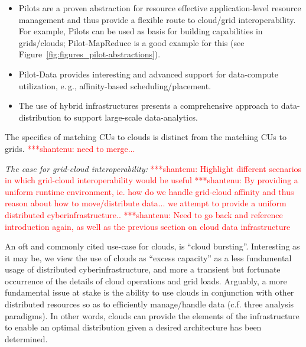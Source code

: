 \documentclass[times]{cpeauth}
\newcommand{\jhanote}[1]{ {\textcolor{red} { ***shantenu: #1 }}}
\newcommand{\jhanote}[1]{}
\newcommand{\pilots}{Pilots\xspace}
\newcommand{\pilotdata}{Pilot-Data\xspace}
\newcommand{\cus}{CUs\xspace}
\begin{document}
\begin{itemize}
\item \pilots are a proven abstraction for resource effective
  application-level resource management and thus provide a flexible
  route to cloud/grid interoperability. For example, \pilots can be used as 
  basis for building capabilities in grids/clouds; Pilot-MapReduce is a good 
  example for this (see Figure~\ref{fig:figures_pilot-abstractions}).
\item \pilotdata provides interesting and advanced support for
  data-compute utilization, e.\,g., affinity-based scheduling/placement.
\item The use of hybrid infrastructures presents a comprehensive
  approach to data-distribution to support large-scale data-analytics.
\end{itemize}


The specifics of matching \cus to clouds is distinct from the matching
\cus to grids.\jhanote{need to merge...}

{\it The case for grid-cloud interoperability:} \jhanote{Highlight
  different scenarios in which grid-cloud interoperability would be
  useful} \jhanote{By providing a uniform runtime environment, ie.
  how do we handle grid-cloud affinity and thus reason about how to
  move/distribute data... we attempt to provide a uniform distributed
  cyberinfrastructure..} \jhanote{Need to go back and reference
  introduction again, as well as the previous section on cloud data
  infrastructure}

An oft and commonly cited use-case for clouds, is ``cloud bursting''.
Interesting as it may be, we view the use of clouds as ``excess
capacity'' as a less fundamental usage of distributed
cyberinfrastructure, and more a transient but fortunate occurrence of
the details of cloud operations and grid loads. Arguably, a more
fundamental issue at stake is the ability to use clouds in conjunction
with other distributed resources so as to efficiently manage/handle
data (c.f. three analysis paradigms).  In other words, clouds can
provide the elements of the infrastructure to enable an optimal
distribution given a desired architecture has been determined.
\end{document}
